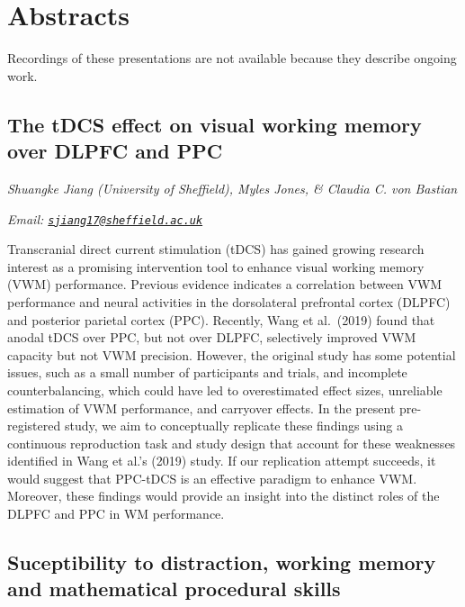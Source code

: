 \documentclass[
  12pt,
]{book}
\begin{document}
\hypertarget{abstracts-6}{%
\section{Abstracts}\label{abstracts-6}}

Recordings of these presentations are not available because they describe ongoing work.

\hypertarget{the-tdcs-effect-on-visual-working-memory-over-dlpfc-and-ppc}{%
\subsection{The tDCS effect on visual working memory over DLPFC and PPC}\label{the-tdcs-effect-on-visual-working-memory-over-dlpfc-and-ppc}}

\emph{Shuangke Jiang (University of Sheffield), Myles Jones, \& Claudia C. von Bastian}

\emph{Email: \href{mailto:sjiang17@sheffield.ac.uk}{\nolinkurl{sjiang17@sheffield.ac.uk}}}

Transcranial direct current stimulation (tDCS) has gained growing research interest as a promising intervention tool to enhance visual working memory (VWM) performance. Previous evidence indicates a correlation between VWM performance and neural activities in the dorsolateral prefrontal cortex (DLPFC) and posterior parietal cortex (PPC). Recently, Wang et al.~(2019) found that anodal tDCS over PPC, but not over DLPFC, selectively improved VWM capacity but not VWM precision. However, the original study has some potential issues, such as a small number of participants and trials, and incomplete counterbalancing, which could have led to overestimated effect sizes, unreliable estimation of VWM performance, and carryover effects. In the present pre-registered study, we aim to conceptually replicate these findings using a continuous reproduction task and study design that account for these weaknesses identified in Wang et al.'s (2019) study. If our replication attempt succeeds, it would suggest that PPC-tDCS is an effective paradigm to enhance VWM. Moreover, these findings would provide an insight into the distinct roles of the DLPFC and PPC in WM performance.

\hypertarget{suceptibility-to-distraction-working-memory-and-mathematical-procedural-skills}{%
\subsection{Suceptibility to distraction, working memory and mathematical procedural skills}\label{suceptibility-to-distraction-working-memory-and-mathematical-procedural-skills}}
\end{document}
